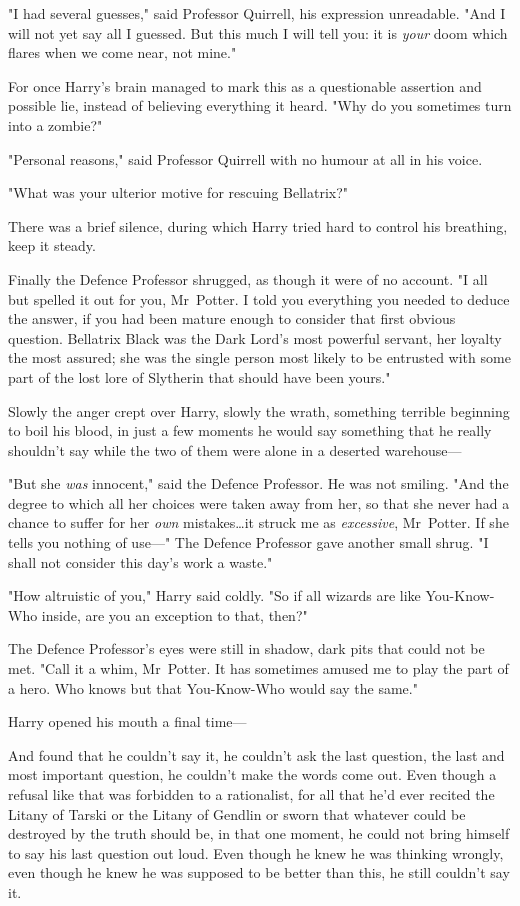"I had several guesses," said Professor Quirrell, his expression unreadable.
"And I will not yet say all I guessed. But this much I will tell you: it is
\emph{your} doom which flares when we come near, not mine."

For once Harry's brain managed to mark this as a questionable assertion and
possible lie, instead of believing everything it heard. "Why do you sometimes
turn into a zombie?"

"Personal reasons," said Professor Quirrell with no humour at all in his voice.

"What was your ulterior motive for rescuing Bellatrix?"

There was a brief silence, during which Harry tried hard to control his
breathing, keep it steady.

Finally the Defence Professor shrugged, as though it were of no account. "I all
but spelled it out for you, Mr~Potter. I told you everything you needed to
deduce the answer, if you had been mature enough to consider that first obvious
question. Bellatrix Black was the Dark Lord's most powerful servant, her
loyalty the most assured; she was the single person most likely to be entrusted
with some part of the lost lore of Slytherin that should have been yours."

Slowly the anger crept over Harry, slowly the wrath, something terrible
beginning to boil his blood, in just a few moments he would say something that
he really shouldn't say while the two of them were alone in a deserted
warehouse—

"But she \emph{was} innocent," said the Defence Professor. He was not smiling.
"And the degree to which all her choices were taken away from her, so that she
never had a chance to suffer for her \emph{own} mistakes…it struck me
as \emph{excessive}, Mr~Potter. If she tells you nothing of use—" The
Defence Professor gave another small shrug. "I shall not consider this day's
work a waste."

"How altruistic of you," Harry said coldly. "So if all wizards are like
You-Know-Who inside, are you an exception to that, then?"

The Defence Professor's eyes were still in shadow, dark pits that could not be
met. "Call it a whim, Mr~Potter. It has sometimes amused me to play the part
of a hero. Who knows but that You-Know-Who would say the same."

Harry opened his mouth a final time—

And found that he couldn't say it, he couldn't ask the last question, the last
and most important question, he couldn't make the words come out. Even though a
refusal like that was forbidden to a rationalist, for all that he'd ever
recited the Litany of Tarski or the Litany of Gendlin or sworn that whatever
could be destroyed by the truth should be, in that one moment, he could not
bring himself to say his last question out loud. Even though he knew he was
thinking wrongly, even though he knew he was supposed to be better than this,
he still couldn't say it.

